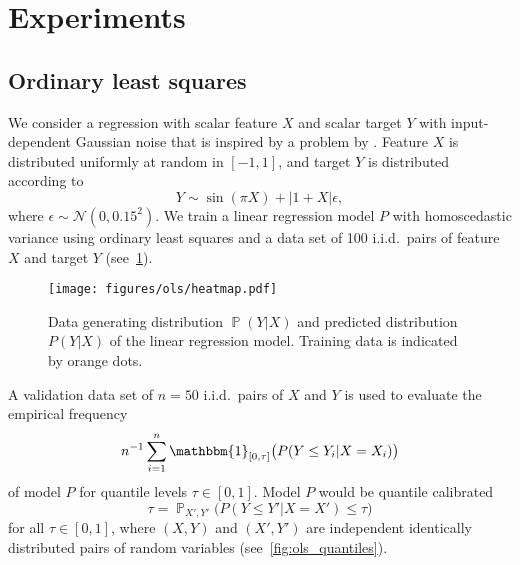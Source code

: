 \documentclass{article}
\DeclareMathOperator{\Prob}{\mathbb{P}}
\begin{document}
\clearpage

\appendix
{}
\renewcommand*{\thetheorem}{\thesection.\arabic{theorem}}
\renewcommand*{\thelemma}{\thesection.\arabic{lemma}}
\renewcommand*{\theproposition}{\thesection.\arabic{proposition}}
\renewcommand*{\thecorollary}{\thesection.\arabic{corollary}}
\renewcommand*{\thedefinition}{\thesection.\arabic{definition}}
\renewcommand*{\theexample}{\thesection.\arabic{example}}
\renewcommand*{\theremark}{\thesection.\arabic{remark}}
\makeatletter
{}
\makeatother

\section{Experiments}
\label{app:experiments}

\subsection{Ordinary least squares}\label{app:ols}

We consider a regression with scalar feature $X$ and scalar target $Y$ with input-dependent Gaussian noise
that is inspired by a problem by \citet{Gustafsson2019}. Feature $X$ is
distributed uniformly at random in $[-1, 1]$, and target $Y$ is distributed according to
\begin{equation*}
    Y \sim \sin(\pi X) + | 1 + X | \epsilon,
\end{equation*}
where $\epsilon \sim \mathcal{N}(0, 0.15^2)$. We train a linear regression model $P$ with
homoscedastic variance using ordinary least squares and a data set of 100 i.i.d.\
pairs of feature $X$ and target $Y$ (see~\cref{fig:ols_heatmap}).

\begin{figure}[hpt]
    \begin{center}
        \texttt{[image: figures/ols/heatmap.pdf]}
        \caption{Data generating distribution $\Prob(Y|X)$ and predicted distribution $P(Y|X)$ of the linear regression model.
        Training data is indicated by orange dots.}
        \label{fig:ols_heatmap}
    \end{center}
\end{figure}

A validation data set of $n = 50$ i.i.d.\ pairs of $X$ and $Y$ is used to
evaluate the empirical frequency
\begin{equation*}
    n^{-1} \sum_{i=1}^n \mathbbm{1}_{[0,\tau]}\big(P(Y \leq Y_i | X = X_i)\big)
\end{equation*}
of model $P$ for quantile levels $\tau \in [0, 1]$. Model $P$ would be quantile
calibrated~\citep{Song2019}
\begin{equation*}
    \tau = \Prob_{X',Y'}\big(P(Y \leq Y' | X = X') \leq \tau \big)
\end{equation*}
for all $\tau \in [0,1]$, where $(X, Y)$ and $(X', Y')$ are independent identically
distributed pairs of random variables (see~\cref{fig:ols_quantiles}).
\end{document}
